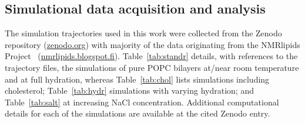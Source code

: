 \documentclass[journal=jpcbfk,manuscript=article,layout=twocolumn]{achemso}
\begin{document}
\subsection{Simulational data acquisition and analysis}
%
The simulation trajectories used in this work were collected from the Zenodo repository (\url{zenodo.org}) with majority of the data originating from the NMRlipids Project~\cite{botan15,catte16} (\url{nmrlipids.blogspot.fi}).
Table~\ref{tab:standr} details, with references to the trajectory files, the simulations of pure POPC bilayers at/near room temperature and at full hydration, whereas
Table~\ref{tab:chol} lists simulations including cholesterol;
Table~\ref{tab:hydr} simulations with varying hydration; and
Table~\ref{tab:salt} at increasing NaCl concentration.
Additional computational details for each of the simulations are available at the cited Zenodo entry.

\begin{table}[t!]
\caption{Analyzed simulations of POPC lipid bilayers at standard conditions.}
\begin{minipage}[t]{\columnwidth}
\end{minipage}
\label{tab:standr}
\end{table}
\end{document}
